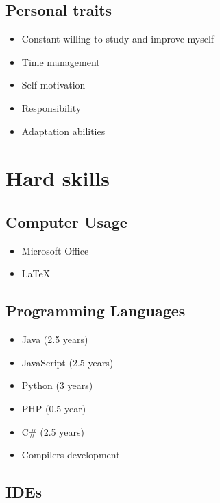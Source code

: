 \documentclass[a4paper,12pt]{article}
\begin{document}
\subsection*{Personal traits}

\begin{itemize}
    \item Constant willing to study and improve myself
    \item Time management
    \item Self-motivation
    \item Responsibility
    \item Adaptation abilities
\end{itemize}

\newpage

\section*{Hard skills}

\subsection*{Computer Usage}

\begin{itemize}
    \item Microsoft Office
    \item LaTeX 
\end{itemize}

\smallskip

\subsection*{Programming Languages}

\begin{multicols}{2}
\begin{itemize}
    \item Java (2.5 years)
    \item JavaScript (2.5 years)
    \item Python (3 years)
    \item PHP (0.5 year)
    \item C\# (2.5 years)
    \item Compilers development
\end{itemize}
\end{multicols}

\subsection*{IDEs}
\end{document}
